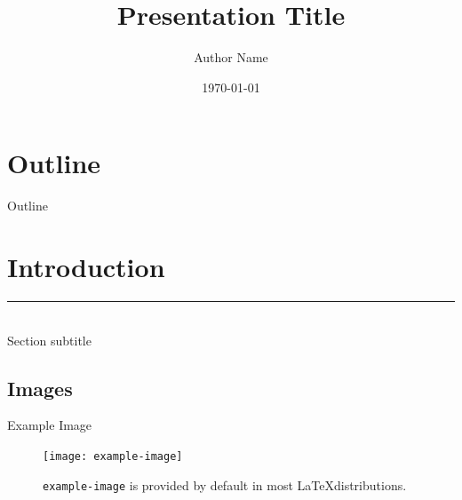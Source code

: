 \documentclass{beamer}
\title{Presentation Title }
\author{\small{Author Name}}
\institute{UC Davis}
\date{\today} %
\begin{document}
\footnotesize{
{ 
\frame{\titlepage}}

\section*{Outline}

\begin{frame}{Outline}
  \tableofcontents
\end{frame}

\section{Introduction}

  \begin{frame}[plain]
    \vfill
    \centering
    \begin{beamercolorbox}[sep=8pt,center,shadow=true,rounded=true]{}
      \insertsectionhead\par%
      \color{davisblue}\noindent\rule{10cm}{1pt} \\
      \footnotesize{Section subtitle}
    \end{beamercolorbox}
    \vfill
  \end{frame}
  
\subsection{Images}

  \begin{frame}{Example Image}
    \begin{figure}
      \texttt{[image: example-image]}
      \caption{\texttt{example-image} is provided by default in most \LaTeX distributions.}
      \label{fig:example}
    \end{figure}
  \end{frame}


}
\end{document}
